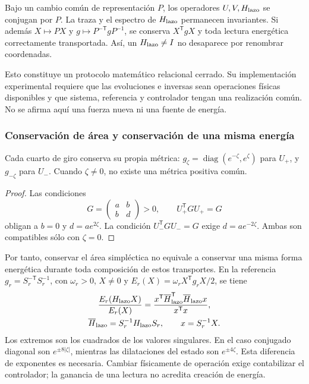 Bajo un cambio común de representación \(P\), los operadores
\(U,V,H_{\rm lazo}\) se conjugan por \(P\).
La traza y el espectro de \(H_{\rm lazo}\) permanecen invariantes.
Si además \(X\mapsto PX\) y
\(g\mapsto P^{-\mathsf T}gP^{-1}\), se conserva
\(X^{\mathsf T}gX\) y toda lectura energética correctamente
transportada. Así, un \(H_{\rm lazo}\ne I\) no desaparece por
renombrar coordenadas.

Esto constituye un protocolo matemático relacional cerrado.
Su implementación experimental requiere que las evoluciones e
inversas sean operaciones físicas disponibles y que sistema,
referencia y controlador tengan una realización común.
No se afirma aquí una fuerza nueva ni una fuente de energía.

\subsubsection{Conservación de área y conservación de una misma energía}
\label{md:comp:area-energia}

\begin{proposition}
\label{md:comp:prop-metrica}
Cada cuarto de giro conserva su propia métrica:
\(g_\zeta=\operatorname{diag}(e^{-\zeta},e^\zeta)\) para \(U_+\),
y \(g_{-\zeta}\) para \(U_-\). Cuando \(\zeta\ne0\), no existe
una métrica positiva común.
\end{proposition}
\begin{proof}
Las condiciones
\[
 G=\begin{pmatrix}a&b\\b&d\end{pmatrix}>0,
 \qquad U_+^{\mathsf T}GU_+=G
\]
obligan a \(b=0\) y \(d=ae^{2\zeta}\).
La condición \(U_-^{\mathsf T}GU_-=G\) exige
\(d=ae^{-2\zeta}\). Ambas son compatibles sólo con \(\zeta=0\).
\end{proof}

Por tanto, conservar el área simpléctica no equivale a conservar
una misma forma energética durante toda composición de estos
transportes. En la referencia
\(g_r=S_r^{-\mathsf T}S_r^{-1}\), con \(\omega_r>0\),
\(X\ne0\) y \(E_r(X)=\omega_r X^{\mathsf T}g_rX/2\), se tiene
\begin{equation}
 \begin{gathered}
 \frac{E_r(H_{\rm lazo}X)}{E_r(X)}
 =\frac{x^{\mathsf T}\overline{H}_{\rm lazo}^{\mathsf T}
                   \overline{H}_{\rm lazo}x}{x^{\mathsf T}x},\\
 \overline{H}_{\rm lazo}=S_r^{-1}H_{\rm lazo}S_r,\qquad
 x=S_r^{-1}X.
 \end{gathered}
 \label{md:comp:cociente-energia}
\end{equation}
Los extremos son los cuadrados de los valores singulares.
En el caso conjugado diagonal son \(e^{\pm8|\zeta|}\), mientras
las dilataciones del estado son \(e^{\pm4\zeta}\).
Esta diferencia de exponentes es necesaria. Cambiar físicamente
de operación exige contabilizar el controlador; la ganancia de
una lectura no acredita creación de energía.

